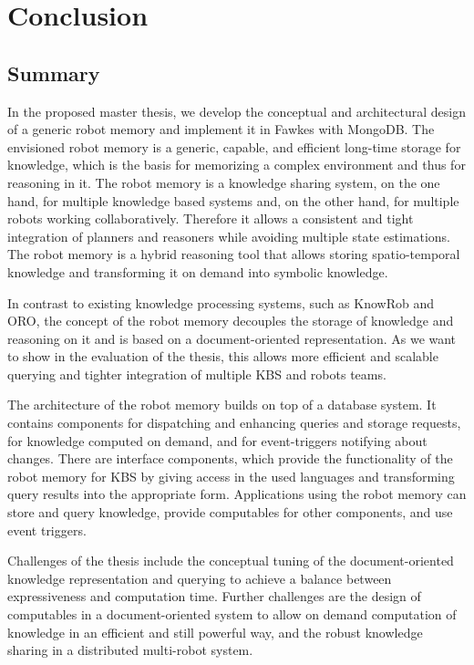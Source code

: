\chapter{Conclusion}
\label{chap:conclusion}
\section{Summary}
\label{sec:summary}
In the proposed master thesis, we develop the conceptual and
architectural design of a generic robot memory and implement it in
Fawkes with MongoDB. The envisioned robot memory is a generic,
capable, and efficient long-time storage for knowledge, which is the
basis for memorizing a complex environment and thus for reasoning in
it. The robot memory is a knowledge sharing system, on the one hand,
for multiple knowledge based systems and, on the other hand, for
multiple robots working collaboratively. Therefore it allows a
consistent and tight integration of planners and reasoners while
avoiding multiple state estimations. The robot memory is a hybrid
reasoning tool that allows storing spatio-temporal knowledge and
transforming it on demand into symbolic knowledge.

In contrast to existing knowledge processing systems, such as KnowRob
and ORO, the concept of the robot memory decouples the storage of
knowledge and reasoning on it and is based on a document-oriented
representation. As we want to show in the evaluation of the thesis,
this allows more efficient and scalable querying and tighter
integration of multiple KBS and robots teams.

The architecture of the robot memory builds on top of a database
system. It contains components for dispatching and enhancing queries
and storage requests, for knowledge computed on demand, and for
event-triggers notifying about changes. There are interface
components, which provide the functionality of the robot memory for
KBS by giving access in the used languages and transforming query
results into the appropriate form. Applications using the robot memory
can store and query knowledge, provide computables for other
components, and use event triggers.

Challenges of the thesis include the conceptual tuning of the
document-oriented knowledge representation and querying to achieve a
balance between expressiveness and computation time. Further
challenges are the design of computables in a document-oriented system
to allow on demand computation of knowledge in an efficient and still
powerful way, and the robust knowledge sharing in a distributed
multi-robot system.

